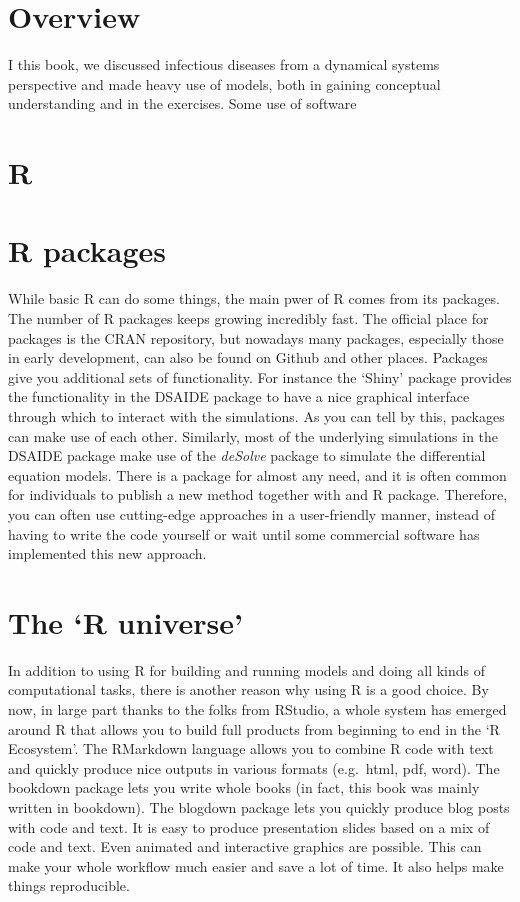 \documentclass[
]{book}
\begin{document}
\hypertarget{overview}{%
\section{Overview}\label{overview}}

I this book, we discussed infectious diseases from a dynamical systems perspective and made heavy use of models, both in gaining conceptual understanding and in the exercises. Some use of software

\hypertarget{r}{%
\section{R}\label{r}}

\hypertarget{r-packages}{%
\section{R packages}\label{r-packages}}

While basic R can do some things, the main pwer of R comes from its packages. The number of R packages keeps growing incredibly fast. The official place for packages is the CRAN repository, but nowadays many packages, especially those in early development, can also be found on Github and other places. Packages give you additional sets of functionality. For instance the `Shiny' package provides the functionality in the DSAIDE package to have a nice graphical interface through which to interact with the simulations. As you can tell by this, packages can make use of each other. Similarly, most of the underlying simulations in the DSAIDE package make use of the \emph{deSolve} package to simulate the differential equation models. There is a package for almost any need, and it is often common for individuals to publish a new method together with and R package. Therefore, you can often use cutting-edge approaches in a user-friendly manner, instead of having to write the code yourself or wait until some commercial software has implemented this new approach.

\hypertarget{the-r-universe}{%
\section{The `R universe'}\label{the-r-universe}}

In addition to using R for building and running models and doing all kinds of computational tasks, there is another reason why using R is a good choice. By now, in large part thanks to the folks from RStudio, a whole system has emerged around R that allows you to build full products from beginning to end in the `R Ecosystem'. The RMarkdown language allows you to combine R code with text and quickly produce nice outputs in various formats (e.g.~html, pdf, word). The bookdown package lets you write whole books (in fact, this book was mainly written in bookdown). The blogdown package lets you quickly produce blog posts with code and text. It is easy to produce presentation slides based on a mix of code and text. Even animated and interactive graphics are possible. This can make your whole workflow much easier and save a lot of time. It also helps make things reproducible.
\end{document}
